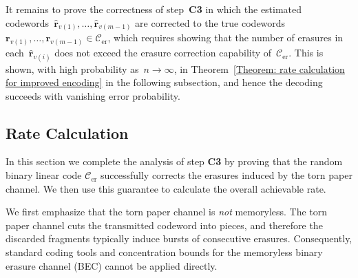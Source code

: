 \documentclass[journal,letterpaper,onecolumn,11pt]{IEEEtran}
\newcommand{\cC}{\mathcal{C}}
\newcommand{\boldr}{\mathbf{r}}
\begin{document}
It remains to prove the correctness of step~\textbf{C3} in which the estimated codewords~$\hat{\boldr}_{v(1)},\ldots,\hat{\boldr}_{v(m-1)}$ are corrected to the true codewords $\boldr_{v(1)},\ldots,\boldr_{v(m-1)}\in \cC_{\text{er}}$, which requires showing that the number of erasures in each~$\hat{\boldr}_{v(i)}$ does not exceed the erasure correction capability of~$\cC_{\text{er}}$.
This is shown, with high probability as~$n\to\infty$, in Theorem~\ref{Theorem: rate calculation for improved encoding} in the following subsection, and hence the decoding succeeds with vanishing error probability.





\subsection{Rate Calculation}\label{section:calculation of rate}
In this section we complete the analysis of step \textbf{C3} by proving that the random binary linear code
$\cC_{\mathrm{er}}$ successfully corrects the erasures induced by the torn paper channel. 
We then use this guarantee to calculate the overall achievable rate.

We first emphasize that the torn paper channel is  \emph{not} memoryless. 
The torn paper channel cuts the transmitted codeword into pieces, and therefore the discarded fragments typically
induce bursts of consecutive erasures. Consequently, standard coding tools and concentration bounds for the
memoryless binary erasure channel (BEC) cannot be applied directly.
\end{document}
